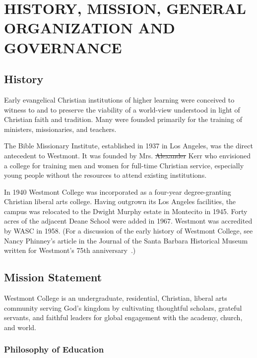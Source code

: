 \section{HISTORY, MISSION, GENERAL ORGANIZATION
		AND GOVERNANCE}
	\label{sec:HMGOG}
	\subsection{History}
		Early evangelical Christian institutions of higher learning were conceived to
		witness to and to preserve the viability of a world-view understood in light of
		Christian faith and tradition. Many were founded primarily for the training of
		ministers, missionaries, and teachers.

		The Bible Missionary Institute, established in 1937 in Los Angeles, was the
		direct antecedent to Westmont. It was founded by Mrs. \st{Alexander}  Kerr who
		envisioned a college for training men and women for full-time Christian service,
		especially young people without the resources to attend existing institutions.

		In 1940 Westmont College was incorporated as a four-year degree-granting
		Christian liberal arts college. Having outgrown its Los Angeles facilities, the
		campus was relocated to the Dwight Murphy estate in Montecito in 1945.  Forty
		acres of the adjacent Deane School were added in 1967. Westmont was accredited
		by WASC in 1958. (For a discussion of the early history of Westmont College, see
		Nancy Phinney's article in the
		Journal of the Santa Barbara Historical Museum
		written for Westmont's 75th anniversary~\cite{Phinney2012}.)

	\subsection{Mission Statement}

		Westmont College is an undergraduate, residential, Christian, liberal arts
		community serving God's kingdom by cultivating thoughtful scholars, grateful
		servants, and faithful leaders for global engagement with the academy, church,
		and world.

		\subsubsection{Philosophy of Education}

